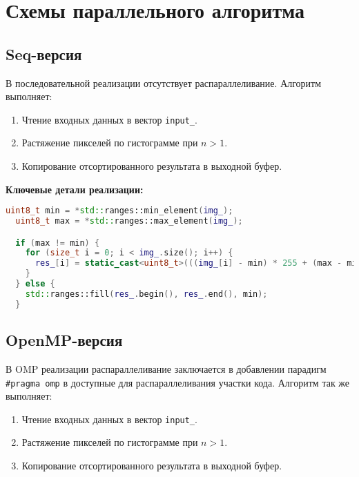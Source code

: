 \documentclass[a4paper,12pt]{article}
\begin{document}
\section{Схемы параллельного алгоритма}
\subsection{Seq-версия}
\hspace*{1.25em}В последовательной реализации отсутствует распараллеливание. Алгоритм выполняет:
\begin{enumerate}
    \item Чтение входных данных в вектор \texttt{input\_}.
    \item Растяжение пикселей по гистограмме при $n>1$.
    \item Копирование отсортированного результата в выходной буфер.
\end{enumerate}
\noindent\textbf{Ключевые детали реализации:}

     \begin{lstlisting}[language=C++,
    breaklines=true,       % Автоматический перенос строк
    columns=fullflexible ]
uint8_t min = *std::ranges::min_element(img_);
  uint8_t max = *std::ranges::max_element(img_);

  if (max != min) {
    for (size_t i = 0; i < img_.size(); i++) {
      res_[i] = static_cast<uint8_t>(((img_[i] - min) * 255 + (max - min) / 2) / (max - min));
    }
  } else {
    std::ranges::fill(res_.begin(), res_.end(), min);
  }
    \end{lstlisting}


\subsection{OpenMP-версия}
\hspace*{1.25em}В OMP реализации распараллеливание заключается в добавлении парадигм \texttt{\#pragma omp} в доступные для распараллеливания участки кода. Алгоритм так же выполняет:
\begin{enumerate}
    \item Чтение входных данных в вектор \texttt{input\_}.
      \item Растяжение пикселей по гистограмме при $n>1$.
    \item Копирование отсортированного результата в выходной буфер.
\end{enumerate}
\end{document}
